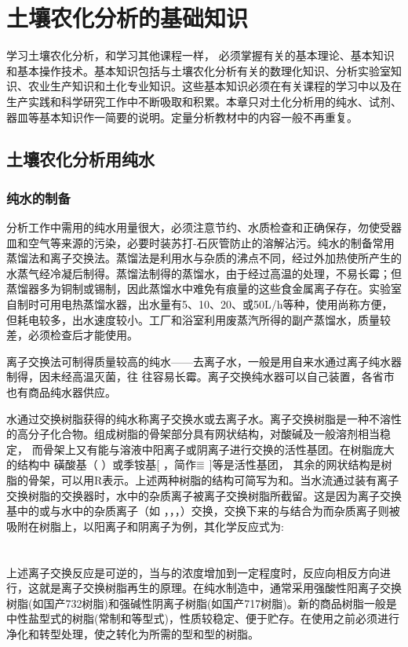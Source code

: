 \chapter{土壤农化分析的基础知识}

学习土壤农化分析，和学习其他课程一样， 必须掌握有关的基本理论、基本知识和基本操作技术。基本知识包括与土壤农化分析有关的数理化知识、分析实验室知识、农业生产知识和土化专业知识。这些基本知识必须在有关课程的学习中以及在生产实践和科学研究工作中不断吸取和积累。本章只对土化分析用的纯水、试剂、器皿等基本知识作一简要的说明。定量分析教材中的内容一般不再重复。

\section{土壤农化分析用纯水}
\subsection{纯水的制备}

分析工作中需用的纯水用量很大，必须注意节约、水质检查和正确保存，勿使受器皿和空气等来源的污染，必要时装苏打-石灰管防止的溶解沾污。纯水的制备常用蒸馏法和离子交换法。蒸馏法是利用水与杂质的沸点不同，经过外加热使所产生的水蒸气经冷凝后制得。蒸馏法制得的蒸馏水，由于经过高温的处理，不易长霉；但蒸馏器多为铜制或锡制，因此蒸馏水中难免有痕量的这些食金属离子存在。实验室自制时可用电热蒸馏水器，出水量有5、10、20、或50L/h等种，使用尚称方便，但耗电较多，出水速度较小。工厂和浴室利用废蒸汽所得的副产蒸馏水，质量较差，必须检查后才能使用。

离子交换法可制得质量较高的纯水——去离子水，一般是用自来水通过离子纯水器制得，因未经高温灭菌，往
往容易长霉。离子交换纯水器可以自己装置，各省市也有商品纯水器供应。

水通过交换树脂获得的纯水称离子交换水或去离子水。离子交换树脂是一种不溶性的高分子化合物。组成树脂的骨架部分具有网状结构，对酸碱及一般溶剂相当稳定， 而骨架上又有能与溶液中阳离子或阴离子进行交换的活性基团。在树脂庞大的结构中 磺酸基（ ）或季铵基[  ，简作$\superequiv$ ]等是活性基团， 其余的网状结构是树脂的骨架，可以用R表示。上述两种树脂的结构可简写为和。当水流通过装有离子交换树脂的交换器时，水中的杂质离子被离子交换树脂所截留。这是因为离子交换基中的或与水中的杂质离子（如 ，，，）交换，交换下来的与结合为而杂质离子则被吸附在树脂上，以阳离子和阴离子为例，其化学反应式为:
{\centering
{}\\
\\
\\}
上述离子交换反应是可逆的，当与的浓度增加到一定程度时，反应向相反方向进行，这就是离子交换树脂再生的原理。在纯水制造中，通常采用强酸性阳离子交换树脂(如国产732树脂)和强碱性阴离子树脂(如国产717树脂)。新的商品树脂一般是中性盐型式的树脂(常制和等型式)，性质较稳定、便于贮存。在使用之前必须进行净化和转型处理，使之转化为所需的型和型的树脂。

